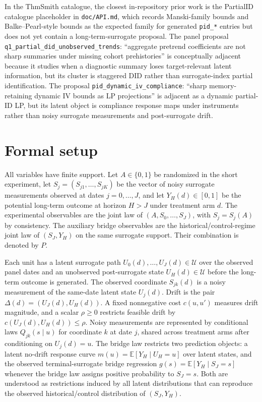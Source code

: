 \documentclass[11pt]{article}
\newcommand{\E}{\mathbb{E}}
\theoremstyle{definition}
\theoremstyle{plain}
\theoremstyle{remark}
\begin{document}
In the ThmSmith catalogue, the closest in-repository prior work is the PartialID catalogue placeholder in \texttt{doc/API.md}, which records Manski-family bounds and Balke--Pearl-style bounds as the expected family for generated \texttt{pid\_*} entries but does not yet contain a long-term-surrogate proposal.  The panel proposal \texttt{q1\_partial\_did\_unobserved\_trends}: ``aggregate pretrend coefficients are not sharp summaries under missing cohort prehistories'' is conceptually adjacent because it studies when a diagnostic summary loses target-relevant latent information, but its cluster is staggered DID rather than surrogate-index partial identification.  The proposal \texttt{pid\_dynamic\_iv\_compliance}: ``sharp memory-retaining dynamic IV bounds as LP projections'' is adjacent as a dynamic partial-ID LP, but its latent object is compliance response maps under instruments rather than noisy surrogate measurements and post-surrogate drift.

\section{Formal setup}
All variables have finite support.  Let \(A\in\{0,1\}\) be randomized in the short experiment, let \(S_j=(S_{j1},\ldots,S_{jK})\) be the vector of noisy surrogate measurements observed at dates \(j=0,\ldots,J\), and let \(Y_H(d)\in[0,1]\) be the potential long-term outcome at horizon \(H>J\) under treatment arm \(d\).  The experimental observables are the joint law of \((A,S_0,\ldots,S_J)\), with \(S_j=S_j(A)\) by consistency.  The auxiliary bridge observables are the historical/control-regime joint law of \((S_J,Y_H)\) on the same surrogate support.  Their combination is denoted by \(P\).

Each unit has a latent surrogate path \(U_0(d),\ldots,U_J(d)\in\mathcal{U}\) over the observed panel dates and an unobserved post-surrogate state \(U_H(d)\in\mathcal{U}\) before the long-term outcome is generated.  The observed coordinate \(S_{jk}(d)\) is a noisy measurement of the same-date latent state \(U_j(d)\).  Drift is the pair \(\Delta(d)=(U_J(d),U_H(d))\).  A fixed nonnegative cost \(c(u,u')\) measures drift magnitude, and a scalar \(\rho\ge0\) restricts feasible drift by \(c(U_J(d),U_H(d))\le\rho\).  Noisy measurements are represented by conditional laws \(Q_{jk}(s\mid u)\) for coordinate \(k\) at date \(j\), shared across treatment arms after conditioning on \(U_j(d)=u\).  The bridge law restricts two prediction objects: a latent no-drift response curve \(m(u)=\E[Y_H\mid U_H=u]\) over latent states, and the observed terminal-surrogate bridge regression \(g(s)=\E[Y_H\mid S_J=s]\) whenever the bridge law assigns positive probability to \(S_J=s\).  Both are understood as restrictions induced by all latent distributions that can reproduce the observed historical/control distribution of \((S_J,Y_H)\).
\end{document}
